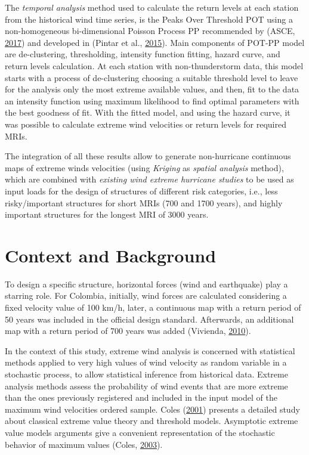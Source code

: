 \documentclass[12pt,twoside]{reedthesis}
\begin{document}
The \emph{temporal analysis} method used to calculate the return levels at each station from the historical wind time series, is the Peaks Over Threshold POT using a non-homogeneous bi-dimensional Poisson Process PP recommended by (ASCE, \protect\hyperlink{ref-Asce2017}{2017}) and developed in (Pintar et al., \protect\hyperlink{ref-Pintar2015}{2015}). Main components of POT-PP model are de-clustering, thresholding, intensity function fitting, hazard curve, and return levels calculation. At each station with non-thunderstorm data, this model starts with a process of de-clustering choosing a suitable threshold level to leave for the analysis only the most extreme available values, and then, fit to the data an intensity function using maximum likelihood to find optimal parameters with the best goodness of fit. With the fitted model, and using the hazard curve, it was possible to calculate extreme wind velocities or return levels for required MRIs.

The integration of all these results allow to generate non-hurricane continuous maps of extreme winds velocities (using \emph{Kriging} as \emph{spatial analysis} method), which are combined with \emph{existing wind extreme hurricane studies} to be used as input loads for the design of structures of different risk categories, i.e., less risky/important structures for short MRIs (700 and 1700 years), and highly important structures for the longest MRI of 3000 years.

\hypertarget{context-and-background}{%
\section{Context and Background}\label{context-and-background}}

To design a specific structure, horizontal forces (wind and earthquake) play a starring role. For Colombia, initially, wind forces are calculated considering a fixed velocity value of 100 km/h, later, a continuous map with a return period of 50 years was included in the official design standard. Afterwards, an additional map with a return period of 700 years was added (Vivienda, \protect\hyperlink{ref-nsr10}{2010}).

In the context of this study, extreme wind analysis is concerned with statistical methods applied to very high values of wind velocity as random variable in a stochastic process, to allow statistical inference from historical data. Extreme analysis methods assess the probability of wind events that are more extreme than the ones previously registered and included in the input model of the maximum wind velocities ordered sample. Coles (\protect\hyperlink{ref-Coles2001}{2001}) presents a detailed study about classical extreme value theory and threshold models. Asymptotic extreme value models arguments give a convenient representation of the stochastic behavior of maximum values (Coles, \protect\hyperlink{ref-Coles2003}{2003}).
\end{document}
